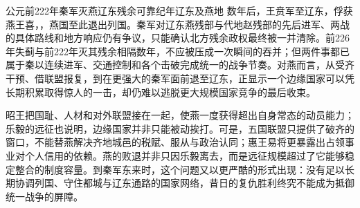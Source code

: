 \begin{event}{公元前222年}{秦军灭燕辽东残余}{可靠纪年}{辽东及燕地}
数年后，王贲军至辽东，俘获燕王喜，，燕国至此退出列国。秦军对辽东燕残部与代地赵残部的先后进军、两战的具体路线和地方响应仍有争议，只能确认北方残余政权最终被一并清除。前226年失蓟与前222年灭其残余相隔数年，不应被压成一次瞬间的吞并；但两件事都已属于秦以连续进军、交通控制和各个击破完成统一的战争节奏。对燕而言，从受齐干预、借联盟报复，到在更强大的秦军面前退至辽东，正显示一个边缘国家可以凭长期积累取得惊人的一击，却仍难以逃脱更大规模国家竞争的最后收束。
\end{event}



\begin{turningpoint}
昭王把国耻、人材和对外联盟接在一起，使燕一度获得超出自身常态的动员能力；乐毅的远征也说明，边缘国家并非只能被动挨打。可是，五国联盟只提供了破齐的窗口，不能替燕解决齐地城邑的税赋、服从与政治认同；惠王易将更暴露出占领事业对个人信用的依赖。燕的败退并非只因乐毅离去，而是远征规模超过了它能够稳定整合的制度容量。到秦军东来时，这个问题又以更严酷的形式出现：没有足以长期协调列国、守住都城与辽东通路的国家网络，昔日的复仇胜利终究不能成为抵御统一战争的屏障。
\end{turningpoint}
